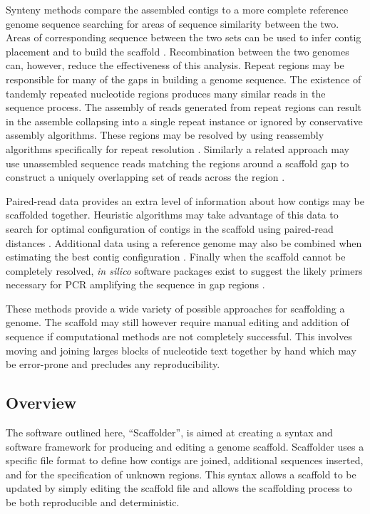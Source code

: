 \documentclass[10pt]{bmc_article}
\newenvironment{bmcformat}{\begin{raggedright}\baselineskip20pt\sloppy\setboolean{publ}{false}}{\end{raggedright}\baselineskip20pt\sloppy}
\begin{document}
\begin{bmcformat}
Synteny methods compare the assembled contigs to a more complete reference
genome sequence searching for areas of sequence similarity between the two.
Areas of corresponding sequence between the two sets can be used to infer
contig placement and to build the scaffold
\cite{richter2007,zhao2008,assefa2009}. Recombination between the two genomes
can, however, reduce the effectiveness of this analysis. Repeat regions may be
responsible for many of the gaps in building a genome sequence. The existence
of tandemly repeated nucleotide regions produces many similar reads in the
sequence process. The assembly of reads generated from repeat regions can
result in the assemble collapsing into a single repeat instance or ignored by
conservative assembly algorithms. These regions may be resolved by using
reassembly algorithms specifically for repeat resolution
\cite{mulyukov2002,koren2010}. Similarly a related approach may use unassembled
sequence reads matching the regions around a scaffold gap to construct
a uniquely overlapping set of reads across the region \cite{tsai2010}. \pb

Paired-read data provides an extra level of information about how contigs may
be scaffolded together. Heuristic algorithms may take advantage of this data to
search for optimal configuration of contigs in the scaffold using paired-read
distances \cite{dayarian2010,boetzer2011}. Additional data using a reference
genome may also be combined when estimating the best contig configuration
\cite{pop2004}. Finally when the scaffold cannot be completely resolved,
\emph{in silico} software packages exist to suggest the likely primers
necessary for PCR amplifying the sequence in gap regions
\cite{gordon2001,nagarajan2010}. \pb

These methods provide a wide variety of possible approaches for scaffolding
a genome. The scaffold may still however require manual editing and addition of
sequence if computational methods are not completely successful. This involves
moving and joining larges blocks of nucleotide text together by hand which may
be error-prone and precludes any reproducibility. \pb

\subsection*{Overview} %

The software outlined here, ``Scaffolder'', is aimed at creating a syntax and
software framework for producing and editing a genome scaffold. Scaffolder uses
a specific file format to define how contigs are joined, additional sequences
inserted, and for the specification of unknown regions. This syntax allows
a scaffold to be updated by simply editing the scaffold file and allows the
scaffolding process to be both reproducible and deterministic. \pb


\end{bmcformat}
\end{document}
